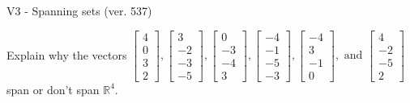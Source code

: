 \begin{exercise}
  \begin{exerciseTitle}V3 - Spanning sets (ver. 537)\end{exerciseTitle}
  \begin{exerciseStatement}
    Explain why the vectors \(\left[\begin{array}{r}
4 \\
0 \\
3 \\
2
\end{array}\right] , \left[\begin{array}{r}
3 \\
-2 \\
-3 \\
-5
\end{array}\right] , \left[\begin{array}{r}
0 \\
-3 \\
-4 \\
3
\end{array}\right] , \left[\begin{array}{r}
-4 \\
-1 \\
-5 \\
-3
\end{array}\right] , \left[\begin{array}{r}
-4 \\
3 \\
-1 \\
0
\end{array}\right] , \text{ and } \left[\begin{array}{r}
4 \\
-2 \\
-5 \\
2
\end{array}\right]\) span or don't span \(\mathbb{R}^4\). 
	



\end{exerciseStatement}
\end{exercise}
